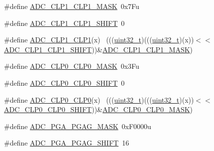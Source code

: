 \begin{DoxyCompactItemize}
\item 
\#define \hyperlink{group___a_d_c___register___masks_ga597fddbb6d859ea54a49dd4a1eea72fb}{A\+D\+C\+\_\+\+C\+L\+P1\+\_\+\+C\+L\+P1\+\_\+\+M\+A\+SK}~0x7\+Fu
\item 
\#define \hyperlink{group___a_d_c___register___masks_gab34e145666bb569d17f381665d6f5156}{A\+D\+C\+\_\+\+C\+L\+P1\+\_\+\+C\+L\+P1\+\_\+\+S\+H\+I\+FT}~0
\item 
\#define \hyperlink{group___a_d_c___register___masks_ga214e6735f8151ad43f51f86364386036}{A\+D\+C\+\_\+\+C\+L\+P1\+\_\+\+C\+L\+P1}(x)                                              ~(((\hyperlink{_p_e___types_8h_a33594304e786b158f3fb30289278f5af}{uint32\+\_\+t})(((\hyperlink{_p_e___types_8h_a33594304e786b158f3fb30289278f5af}{uint32\+\_\+t})(x))$<$$<$\hyperlink{group___a_d_c___register___masks_gab34e145666bb569d17f381665d6f5156}{A\+D\+C\+\_\+\+C\+L\+P1\+\_\+\+C\+L\+P1\+\_\+\+S\+H\+I\+FT}))\&\hyperlink{group___a_d_c___register___masks_ga597fddbb6d859ea54a49dd4a1eea72fb}{A\+D\+C\+\_\+\+C\+L\+P1\+\_\+\+C\+L\+P1\+\_\+\+M\+A\+SK})
\item 
\#define \hyperlink{group___a_d_c___register___masks_ga7a8099e7e4fcb450308767ab0df8e458}{A\+D\+C\+\_\+\+C\+L\+P0\+\_\+\+C\+L\+P0\+\_\+\+M\+A\+SK}~0x3\+Fu
\item 
\#define \hyperlink{group___a_d_c___register___masks_gad3035c445e10948c653ac0a028008109}{A\+D\+C\+\_\+\+C\+L\+P0\+\_\+\+C\+L\+P0\+\_\+\+S\+H\+I\+FT}~0
\item 
\#define \hyperlink{group___a_d_c___register___masks_ga4474d62a7ce00adb7467954027539676}{A\+D\+C\+\_\+\+C\+L\+P0\+\_\+\+C\+L\+P0}(x)                                              ~(((\hyperlink{_p_e___types_8h_a33594304e786b158f3fb30289278f5af}{uint32\+\_\+t})(((\hyperlink{_p_e___types_8h_a33594304e786b158f3fb30289278f5af}{uint32\+\_\+t})(x))$<$$<$\hyperlink{group___a_d_c___register___masks_gad3035c445e10948c653ac0a028008109}{A\+D\+C\+\_\+\+C\+L\+P0\+\_\+\+C\+L\+P0\+\_\+\+S\+H\+I\+FT}))\&\hyperlink{group___a_d_c___register___masks_ga7a8099e7e4fcb450308767ab0df8e458}{A\+D\+C\+\_\+\+C\+L\+P0\+\_\+\+C\+L\+P0\+\_\+\+M\+A\+SK})
\item 
\#define \hyperlink{group___a_d_c___register___masks_ga55a340c6fac33dc33fa72db68c8a6576}{A\+D\+C\+\_\+\+P\+G\+A\+\_\+\+P\+G\+A\+G\+\_\+\+M\+A\+SK}~0x\+F0000u
\item 
\#define \hyperlink{group___a_d_c___register___masks_gaa0979a2ccd896d245b77f053076cf2c6}{A\+D\+C\+\_\+\+P\+G\+A\+\_\+\+P\+G\+A\+G\+\_\+\+S\+H\+I\+FT}~16
\item 

\end{DoxyCompactItemize}
